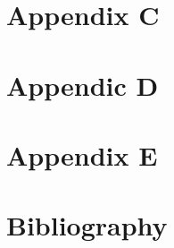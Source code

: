\documentclass[12pt,a4paper,man]{report}
\begin{document}
\part{Appendix C}
\label{sec:org98d9bd2}

\part{Appendic D}
\label{sec:orge950b15}

\part{Appendix E}
\label{sec:org9374b2c}

\part{Bibliography}
\label{sec:org2dcbd1c}
\printglossaries



\end{document}
